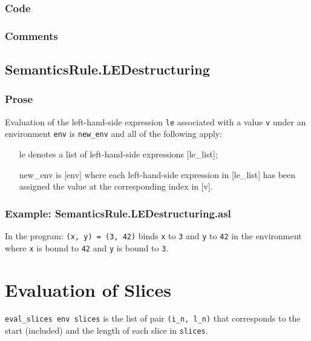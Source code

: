 \documentclass{book}
\begin{document}
  \subsection{Code}

  \subsection{Comments}

\section{SemanticsRule.LEDestructuring \label{sec:SemanticsRule.LEDestructuring}}

    \subsection{Prose}
    Evaluation of the left-hand-side expression \texttt{le} associated with a
value \texttt{v} under an environment \texttt{env} is \texttt{new\_env} and all
of the following apply:
    \begin{itemize}
    \item [le] denotes a list of left-hand-side expressions [le\_list];
    \item [new\_env] is [env] where each left-hand-side expression in [le\_list] has
      been assigned the value at the corresponding index in [v].
    \end{itemize}

    \subsection{Example: SemanticsRule.LEDestructuring.asl}
    In the program:
    \texttt{(x, y) = (3, 42)} binds \texttt{x} to \texttt{3} and \texttt{y} to \texttt{42} in the environment where \texttt{x} is bound to \texttt{42} and \texttt{y} is bound to \texttt{3}.

\chapter{Evaluation of Slices \label{chap:eval_slices}}
\texttt{eval\_slices env slices} is the list of pair \texttt{(i\_n, l\_n)} that
corresponds to the start (included) and the length of each slice in
\texttt{slices}.
\end{document}
